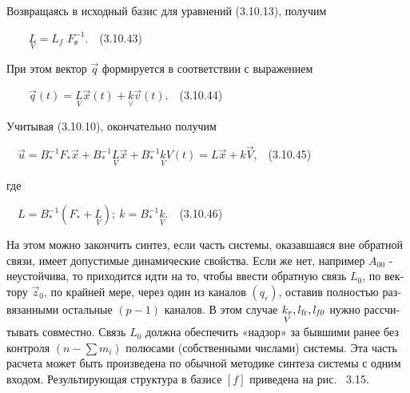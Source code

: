 \documentclass[a4paper]{article}
\newcommand\normalsubformula[1]{\text{\mathversion{normal}$#1$}}
\begin{document}
{\begin{russian}\sffamily
Возвращаясь в исходный базис для уравнений (3.10.13), получим
\end{russian}}

{\begin{russian}\sffamily
\ \ \ \  $\underset V{L}=L_f$ $F_е^{-1}$.\ \ (3.10.43)
\end{russian}}

{\begin{russian}\sffamily
При этом вектор  $\vec q$ формируется в соответствии с выражением
\end{russian}}

{\begin{russian}\sffamily
\ \ \ \  $\vec q(t)=\underset V{L}\vec x(t)+\underset{\vee }{k}\vec v(t)$.\ \ (3.10.44)
\end{russian}}

{\begin{russian}\sffamily
Учитывая (3.10.10), окончательно получим
\end{russian}}

{\begin{russian}\sffamily
\ \  $\vec u=B_{\ast }^{-1}F_{\ast }\vec x+B_{\ast }^{-1}\underset V{L}\vec x+B_{\ast }^{-1}\underset V{k}V(t)=L\vec
x+k\vec V$,\ \ (3.10.45)
\end{russian}}

{\begin{russian}\sffamily
где
\end{russian}}

{\begin{russian}\sffamily
\ \  $L=B_{\ast }^{-1}(F_{\ast }+\underset V{L});\ k=B_{\ast }^{-1}\underset V{k}$.\ \ (3.10.46)
\end{russian}}

{\begin{russian}\sffamily
На этом можно закончить синтез, если часть системы, оказавшаяся вне обратной связи, имеет допустимые динамические
свойства. Если же нет, например  $A_{00}$ - неустойчива, то приходится идти на то, чтобы ввести обратную связь  $L_0$,
по вектору  $\vec z_0$, по крайней мере, через один из каналов  $(q_r)$, оставив полностью развязанными остальные 
$(p-1)$ каналов. В этом случае  $\underset V{k_r},l_{\normalsubformula{\text{fr}}},l_{\mathit{f0}}$ нужно рассчитывать
совместно. Связь  $L_0$ должна обеспечить «надзор» за бывшими ранее без контроля  $(n-\sum m_i)$ полюсами (собственными
числами) системы. Эта часть расчета может быть произведена по обычной методике синтеза системы с одним входом.
Результирующая структура в базисе  $[f]$ приведена на рис. \ 3.15.
\end{russian}}
\end{document}
